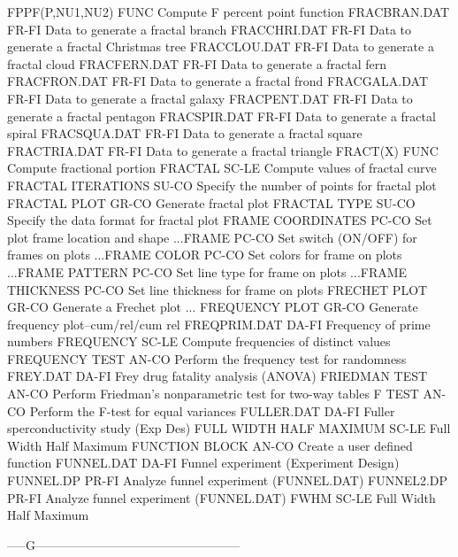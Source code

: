 FPPF(P,NU1,NU2)             FUNC  Compute F percent point function
FRACBRAN.DAT                FR-FI Data to generate a fractal branch
FRACCHRI.DAT                FR-FI Data to generate a fractal Christmas tree
FRACCLOU.DAT                FR-FI Data to generate a fractal cloud
FRACFERN.DAT                FR-FI Data to generate a fractal fern
FRACFRON.DAT                FR-FI Data to generate a fractal frond
FRACGALA.DAT                FR-FI Data to generate a fractal galaxy
FRACPENT.DAT                FR-FI Data to generate a fractal pentagon
FRACSPIR.DAT                FR-FI Data to generate a fractal spiral
FRACSQUA.DAT                FR-FI Data to generate a fractal square
FRACTRIA.DAT                FR-FI Data to generate a fractal triangle
FRACT(X)                    FUNC  Compute fractional portion
FRACTAL                     SC-LE Compute values of fractal curve
FRACTAL ITERATIONS          SU-CO Specify the number of points for fractal plot
FRACTAL PLOT                GR-CO Generate fractal plot
FRACTAL TYPE                SU-CO Specify the data format for fractal plot
FRAME COORDINATES           PC-CO Set plot frame location and shape
...FRAME                    PC-CO Set switch (ON/OFF) for frames on plots
...FRAME COLOR              PC-CO Set colors for frame on plots
...FRAME PATTERN            PC-CO Set line type for frame on plots
...FRAME THICKNESS          PC-CO Set line thickness for frame on plots
FRECHET PLOT                GR-CO Generate a Frechet plot
... FREQUENCY PLOT          GR-CO Generate frequency plot--cum/rel/cum rel
FREQPRIM.DAT                DA-FI Frequency of prime numbers
FREQUENCY                   SC-LE Compute frequencies of distinct values
FREQUENCY TEST              AN-CO Perform the frequency test for randomness
FREY.DAT                    DA-FI Frey drug fatality analysis (ANOVA)
FRIEDMAN TEST               AN-CO Perform Friedman's nonparametric test for two-way tables
F TEST                      AN-CO Perform the F-test for equal variances
FULLER.DAT                  DA-FI Fuller sperconductivity study (Exp Des)
FULL WIDTH HALF MAXIMUM     SC-LE Full Width Half Maximum
FUNCTION BLOCK              AN-CO Create a user defined function
FUNNEL.DAT                  DA-FI Funnel experiment (Experiment Design)
FUNNEL.DP                   PR-FI Analyze funnel experiment (FUNNEL.DAT)
FUNNEL2.DP                  PR-FI Analyze funnel experiment (FUNNEL.DAT)
FWHM                        SC-LE Full Width Half Maximum

-----G--------------------------------------------------

